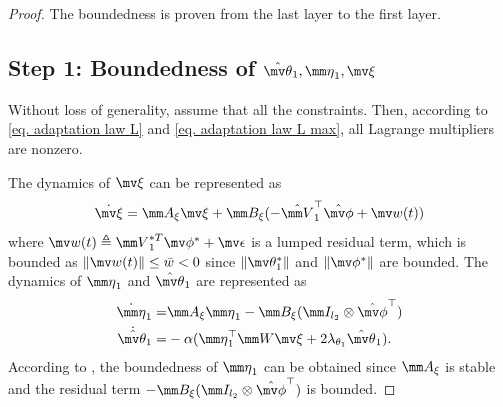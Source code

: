 \documentclass[letterpaper, 10 pt, conference]{ieeeconf}  %
\begin{document}
\begin{proof}
The boundedness is proven from the last layer to the first layer.

\subsection*{Step 1: Boundedness of ${\hat{\mv\theta}}_1,{\mm \eta}_1,\mv \xi$}

\color{black}
Without loss of generality, assume that all the constraints. Then, according to \eqref{eq. adaptation law L} and \eqref{eq. adaptation law L max}, all Lagrange multipliers are nonzero.
\color{black}

The dynamics of $\mv \xi$ can be represented as
\begin{equation}    
    \dot {\mv\xi} = \mm A_\xi\mv \xi +\mm B_\xi
    (
        -\hat {\mm V}_1^\top \hat{\mv\phi}+\mv w(t)
    )
\end{equation}
where $\mv w(t)\triangleq {\mm V}_1^{*T}\mv\phi^*+\mv \epsilon$ is a lumped residual term, which is bounded as $\Vert\mv  w(t)\Vert\le \bar w< 0$ since $\Vert\mv\theta_1^*\Vert$ and $\Vert\mv\phi^*\Vert$ are bounded.
The dynamics of ${\mm \eta}_1$ and ${\hat{\mv\theta}}_1$ are represented as
\begin{equation}
    \begin{aligned}
        \dot{\mm \eta}_1 =
        & 
        \mm A_\xi {\mm \eta}_1 -\mm B_\xi (\mm I_{l_{2}}\otimes \hat{\mv\phi}^\top )
        \\
        \dot{{\hat{\mv\theta}}}_1 =
        & -\alpha 
        (
            {\mm \eta}_1^\top \mm W\mv\xi+2\lambda_{\theta_1} {\hat{\mv\theta}}_1
        ).
    \end{aligned} 
\end{equation}
According to \cite[Chap.~4 T.~1.9]{RN32}, the boundedness of ${\mm \eta}_1$ can be obtained since $\mm A_\xi$ is stable and the residual term $-\mm B_\xi (\mm I_{l_{2}}\otimes \hat{\mv\phi}^\top )$ is bounded.


\end{proof}
\end{document}
